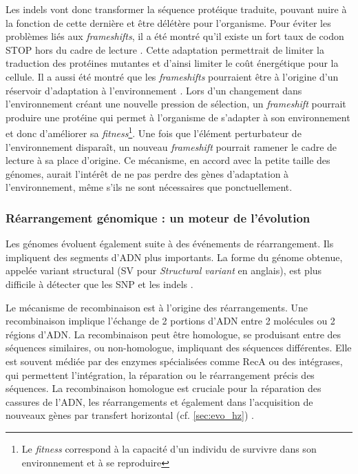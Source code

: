 Les indels vont donc transformer la séquence protéique traduite, pouvant nuire à la fonction de cette dernière et être délétère pour l'organisme. Pour éviter les problèmes liés aux \textit{frameshifts}, il a été montré qu'il existe un fort taux de codon STOP hors du cadre de lecture \cite{tse_natural_2010}. Cette adaptation permettrait de limiter la traduction des protéines mutantes et d'ainsi limiter le coût énergétique pour la cellule. Il a aussi été montré que les \textit{frameshifts} pourraient être à l'origine d'un réservoir d'adaptation à l'environnement \cite{koch_catastrophe_2004}. Lors d'un changement dans l'environnement créant une nouvelle pression de sélection, un \textit{frameshift} pourrait produire une protéine qui permet à l'organisme de s'adapter à son environnement et donc d'améliorer sa \textit{fitness}\footnote{Le \textit{fitness} correspond à la capacité d'un individu de survivre dans son environnement et à se reproduire}. Une fois que l'élément perturbateur de l'environnement disparaît, un nouveau \textit{frameshift} pourrait ramener le cadre de lecture à sa place d'origine. Ce mécanisme, en accord avec la petite taille des génomes, aurait l'intérêt de ne pas perdre des gènes d'adaptation à l'environnement, même s'ils ne sont nécessaires que ponctuellement.

\subsubsection{Réarrangement génomique : un moteur de l'évolution}
\label{sec:rearragement}

Les génomes évoluent également suite à des événements de réarrangement. Ils impliquent des segments d'ADN plus importants. La forme du génome obtenue, appelée variant structural (SV pour \textit{Structural variant} en anglais), est plus difficile à détecter que les SNP et les indels \cite{periwal_insights_2015}.

Le mécanisme de recombinaison est à l'origine des réarrangements. Une recombinaison implique l'échange de 2 portions d'ADN entre 2 molécules ou 2 régions d'ADN. La recombinaison peut être homologue, se produisant entre des séquences similaires, ou non-homologue, impliquant des séquences différentes. Elle est souvent médiée par des enzymes spécialisées comme RecA ou des intégrases, qui permettent l'intégration, la réparation ou le réarrangement précis des séquences. La recombinaison homologue est cruciale pour la réparation des cassures de l'ADN, les réarrangements et également dans l'acquisition de nouveaux gènes par transfert horizontal (cf. \autoref{sec:evo_hz}) \cite{eisenstark_genetic_1977}.

